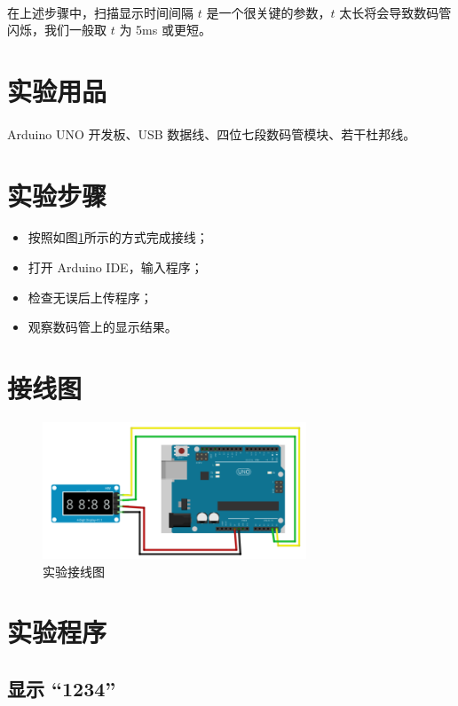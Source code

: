 \documentclass[UTF8, oneside]{ctexbook}
\begin{document}
\paragraph{}
在上述步骤中，扫描显示时间间隔 $t$ 是一个很关键的参数，$t$ 太长将会导致数码管
闪烁，我们一般取 $t$ 为 5ms 或更短。

\section{实验用品}
\paragraph{}
Arduino UNO 开发板、USB 数据线、四位七段数码管模块、若干杜邦线。

\section{实验步骤}
\begin{itemize}
    \item[(1)] 按照如图\ref{s1_line}所示的方式完成接线；
    \item[(2)] 打开 Arduino IDE，输入程序；
    \item[(3)] 检查无误后上传程序；
    \item[(4)] 观察数码管上的显示结果。
\end{itemize}

\section{接线图}
\begin{figure}[h]
    \centering
    \includegraphics[width=0.7\textwidth]{./result/sensor/1/lines.png}
    \caption{实验接线图}
    \label{s1_line}
\end{figure}

\section{实验程序}
\subsection{显示 “1234”}

\end{document}
